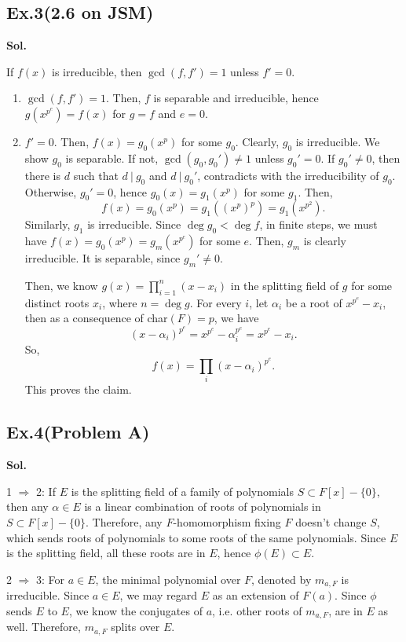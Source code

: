 \documentclass[lang=en,11pt,a4paper,citestyle =authoryear]{elegantpaper}
\begin{document}
\subsection*{Ex.3(2.6 on JSM)}
\textbf{Sol.} \par
    If $f(x)$ is irreducible, then $\gcd(f,f')=1$ unless $f'=0$.
\begin{enumerate}
\item $\gcd(f,f')=1$. Then, $f$ is separable and irreducible, hence $g(x^{p^e})=f(x)$ for $g=f$ and $e=0$.
\item $f'=0$. Then, $f(x)=g_0(x^p)$ for some $g_0$. Clearly, $g_0$ is irreducible. We show $g_0$ is separable. If not, $\gcd(g_0,g_0')\ne 1$ unless $g_0'=0$. If $g_0'\ne 0$, then there is $d$ such that $d\ |\ g_0$ and $d\ |\ g_0'$, contradicts with the irreducibility of $g_0$. Otherwise, $g_0'=0$, hence $g_0(x)=g_1(x^p)$ for some $g_1$. Then, $$f(x)=g_0(x^p)=g_1((x^p)^p)=g_1(x^{p^2}).$$
Similarly, $g_1$ is irreducible. Since $\deg g_0<\deg f$, in finite steps, we must have $f(x)=g_0(x^p)=g_m(x^{p^e})$ for some $e$. Then, $g_m$ is clearly irreducible. It is separable, since $g_m'\ne 0$. 

Then, we know $g(x)=\prod_{i=1}^{n}(x-x_i)$ in the splitting field of $g$ for some distinct roots $x_i$, where $n=\deg g$. For every $i$, let $\alpha_i$ be a root of $x^{p^e}-x_i$, then as a consequence of char$(F)=p$, we have $$(x-\alpha_i)^{p^e}=x^{p^e}-\alpha_i^{p^e}=x^{p^e}-x_i.$$ So,$$f(x)=\prod_i(x-\alpha_i)^{p^e}.$$
This proves the claim.
\end{enumerate}
\par 
\vspace{0.5em}

\subsection*{Ex.4(Problem A)}
\textbf{Sol.} \par
1 $\Rightarrow$ 2: If $E$ is the splitting field of a family of polynomials $S\subset F[x]-\{0\}$, then any $\alpha\in E$ is a linear combination of roots of polynomials in $S\subset F[x]-\{0\}$. Therefore, any $F$-homomorphism fixing $F$ doesn't change $S$, which sends roots of polynomials to some roots of the same polynomials. Since $E$ is the splitting field, all these roots are in $E$, hence $\phi(E)\subset E$.

2 $\Rightarrow$ 3: For $a\in E$, the minimal polynomial over $F$, denoted by $m_{a, F}$ is irreducible. Since $a\in E$, we may regard $E$ as an extension of $F(a)$. Since $\phi$ sends $E$ to $E$, we know the conjugates of $a$, i.e. other roots of $m_{a,F}$, are in $E$ as well. Therefore, $m_{a,F}$ splits over $E$.
\end{document}
